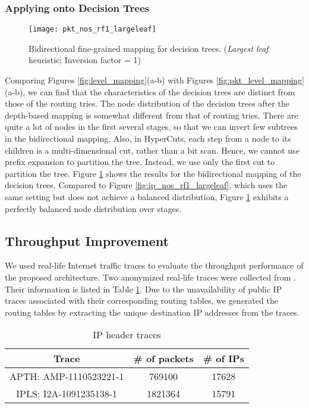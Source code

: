 \documentclass{sigcomm-alternate}
\begin{document}
\subsubsection{Applying onto Decision Trees}

\begin{figure}[htb]
\centering
\texttt{[image: pkt\_nos\_rf1\_largeleaf]}
\caption{Bidirectional fine-grained mapping for decision trees. (\textit{Largest leaf} heuristic; Inversion factor = 1)}
\label{fig:pkt_nos_rf1_largeleaf}
\end{figure}

Comparing Figures \ref{fig:level_mapping}(a-b) with Figures \ref{fig:pkt_level_mapping}(a-b), we can find that the characteristics of the decision trees are distinct from those of the routing tries. The node distribution of the decision trees after the depth-based mapping is somewhat different from that of routing tries. There are quite a lot of nodes in the first several stages, so that we can invert few subtrees in the bidirectional mapping. Also, in HyperCuts, each step from a node to its children is a multi-dimensional cut, rather than a bit scan. Hence, we cannot use prefix expansion to partition the tree. Instead, we use only the first cut to partition the tree. Figure \ref{fig:pkt_nos_rf1_largeleaf} shows the results for the bidirectional mapping of the decision trees. Compared to Figure \ref{fig:ip_nos_rf1_largeleaf}, which uses the same setting but does not achieve a balanced distribution, Figure \ref{fig:pkt_nos_rf1_largeleaf} exhibits a perfectly balanced node distribution over stages.


\subsection{Throughput Improvement}

We used real-life Internet traffic traces to evaluate the throughput performance of the proposed architecture. Two anonymized real-life traces were collected from \cite{trace:nlanr}. Their information is listed in Table \ref{tb:traces}. Due to the unavailability of public IP traces associated with their corresponding routing tables, we generated the routing tables by extracting the unique destination IP addresses from the traces. 

\begin{table}[bht]
\caption{IP header traces}
\label{tb:traces}
\vspace{0.1in}
\begin{center}
\begin{tabular}{|c|c|c|}
\hline
Trace & \# of packets & \# of IPs \\
\hline
\hline
APTH: AMP-1110523221-1 & 769100 & 17628 \\
\hline
IPLS: I2A-1091235138-1 & 1821364 & 15791\\
\hline
\end{tabular}
\end{center}
\end{table}
\end{document}
